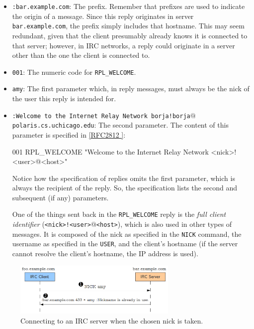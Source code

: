 \documentclass[10pt]{article}
\newcommand{\RFCsection}[2]{\href{http://tools.ietf.org/html/rfc#1\#section-#2}{[RFC#1 \textsection #2]}}
\newenvironment{example}%
{\VerbatimEnvironment\begin{Sbox}\begin{VerbExample}}%
{\end{VerbExample}\end{Sbox}\setlength{\fboxsep}{8pt}\begin{center}\fcolorbox{black}{backgroundgray}{\TheSbox}\end{center}}
\begin{document}
\begin{itemize}
\item \texttt{:bar.example.com}: The prefix. Remember that prefixes are used to indicate the origin of a message. Since this reply originates in server \texttt{bar.example.com}, the prefix simply includes that hostname. This may seem redundant, given that the client presumably already knows it is connected to that server; however, in IRC networks, a reply could originate in a server other than the one the client is connected to.
\item \texttt{001}: The numeric code for \texttt{RPL\_WELCOME}.
\item \texttt{amy}: The first parameter which, in reply messages, must always be the nick of the user this reply is intended for.
\item \texttt{:Welcome to the Internet Relay Network borja!borja$@$polaris.cs.uchicago.edu}: The second parameter. The content of this parameter is specified in \RFCsection{2812}{5}:

\begin{example}
       001    RPL_WELCOME
              "Welcome to the Internet Relay Network
               <nick>!<user>@<host>"
\end{example}

Notice how the specification of replies omits the first parameter, which is always the recipient of the reply. So, the specification lists the second and subsequent (if any) parameters.

One of the things sent back in the \texttt{RPL\_WELCOME} reply is the \emph{full client identifier} (\texttt{<nick>!<user>$@$<host>}), which is also used in other types of messages. It is composed of the nick as specified in the \texttt{NICK} command, the username as specified in the \texttt{USER}, and the client's hostname (if the server cannot resolve the client's hostname, the IP address is used).
\end{itemize}

\begin{figure}
\begin{center}
\includegraphics[width=0.7\textwidth]{duplicatenick.png}
\caption{Connecting to an IRC server when the chosen nick is taken.}
\label{fig:duplicatenick}
\end{center}
\end{figure}
\end{document}

